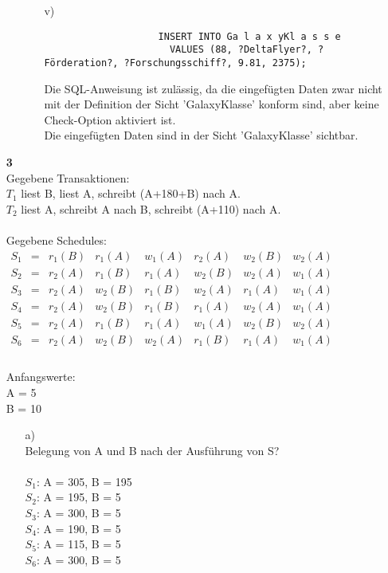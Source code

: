 \documentclass[a4paper,11pt,fleqn]{scrartcl}
\begin{document}
\begin{enumerate}
\begin{enumerate}
\begin{enumerate}
				\item[v)]
				\begin{verbatim}
					INSERT INTO Ga l a x yKl a s s e
					  VALUES (88, ?DeltaFlyer?, ?Förderation?, ?Forschungsschiff?, 9.81, 2375);
				\end{verbatim}
				Die SQL-Anweisung ist zulässig, da die eingefügten Daten zwar nicht mit der Definition der Sicht 'GalaxyKlasse' konform sind, aber keine Check-Option aktiviert ist.\\
				Die eingefügten Daten sind in der Sicht 'GalaxyKlasse' sichtbar.
			\end{enumerate}
		\end{enumerate}

		\newpage
		\item[\textbf{3}] \quad \\
			Gegebene Transaktionen:\\
			$T_1$ liest B, liest A, schreibt (A+180+B) nach A.\\
			$T_2$ liest A, schreibt A nach B, schreibt (A+110) nach A.\\
			\\
			Gegebene Schedules:\\
			\(
			\begin{array}{lcccccccccc}
				S_1 &=& r_1(B) & r_1(A) & w_1(A) & r_2(A) & w_2(B) & w_2(A) \\
				S_2 &=& r_2(A) & r_1(B) & r_1(A) & w_2(B) & w_2(A) & w_1(A) \\
				S_3 &=& r_2(A) & w_2(B) & r_1(B) & w_2(A) & r_1(A) & w_1(A) \\
				S_4 &=& r_2(A) & w_2(B) & r_1(B) & r_1(A) & w_2(A) & w_1(A) \\
				S_5 &=& r_2(A) & r_1(B) & r_1(A) & w_1(A) & w_2(B) & w_2(A) \\
				S_6 &=& r_2(A) & w_2(B) & w_2(A) & r_1(B) & r_1(A) & w_1(A) \\
			\end{array}
			\)
			\\ \\
			Anfangswerte:\\
			A = 5\\
			B = 10

			\begin{enumerate}
				\item[a)]\quad \\
				Belegung von A und B nach der Ausführung von S?\\
				\\
				$S_1$: A = 305, B = 195\\
				$S_2$: A = 195, B = 5\\
				$S_3$: A = 300, B = 5\\
				$S_4$: A = 190, B = 5\\
				$S_5$: A = 115, B = 5\\
				$S_6$: A = 300, B = 5


\end{enumerate}
\end{enumerate}
\end{document}
